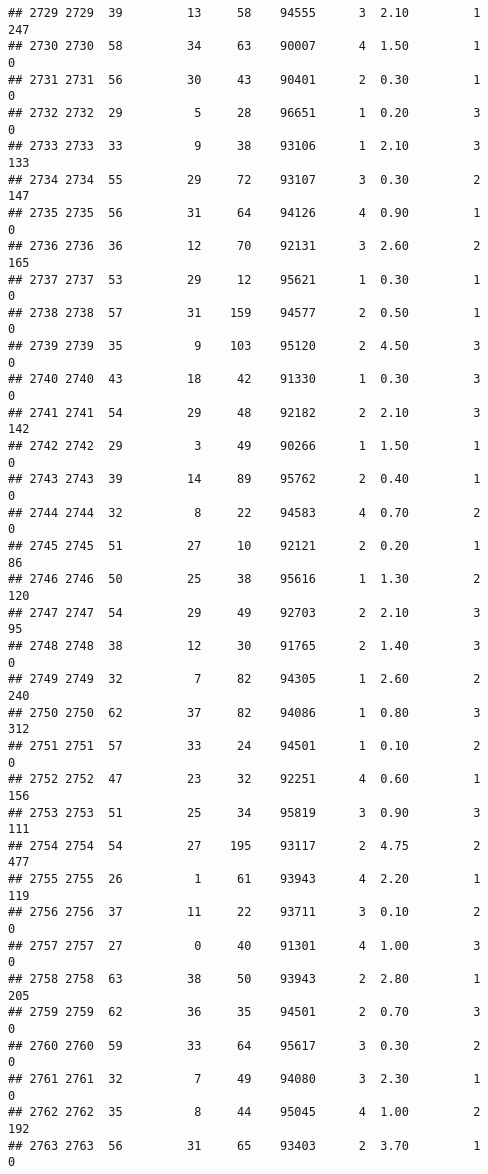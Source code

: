 \documentclass[
]{article}
\begin{document}
\begin{verbatim}
## 2729 2729  39         13     58    94555      3  2.10         1      247
## 2730 2730  58         34     63    90007      4  1.50         1        0
## 2731 2731  56         30     43    90401      2  0.30         1        0
## 2732 2732  29          5     28    96651      1  0.20         3        0
## 2733 2733  33          9     38    93106      1  2.10         3      133
## 2734 2734  55         29     72    93107      3  0.30         2      147
## 2735 2735  56         31     64    94126      4  0.90         1        0
## 2736 2736  36         12     70    92131      3  2.60         2      165
## 2737 2737  53         29     12    95621      1  0.30         1        0
## 2738 2738  57         31    159    94577      2  0.50         1        0
## 2739 2739  35          9    103    95120      2  4.50         3        0
## 2740 2740  43         18     42    91330      1  0.30         3        0
## 2741 2741  54         29     48    92182      2  2.10         3      142
## 2742 2742  29          3     49    90266      1  1.50         1        0
## 2743 2743  39         14     89    95762      2  0.40         1        0
## 2744 2744  32          8     22    94583      4  0.70         2        0
## 2745 2745  51         27     10    92121      2  0.20         1       86
## 2746 2746  50         25     38    95616      1  1.30         2      120
## 2747 2747  54         29     49    92703      2  2.10         3       95
## 2748 2748  38         12     30    91765      2  1.40         3        0
## 2749 2749  32          7     82    94305      1  2.60         2      240
## 2750 2750  62         37     82    94086      1  0.80         3      312
## 2751 2751  57         33     24    94501      1  0.10         2        0
## 2752 2752  47         23     32    92251      4  0.60         1      156
## 2753 2753  51         25     34    95819      3  0.90         3      111
## 2754 2754  54         27    195    93117      2  4.75         2      477
## 2755 2755  26          1     61    93943      4  2.20         1      119
## 2756 2756  37         11     22    93711      3  0.10         2        0
## 2757 2757  27          0     40    91301      4  1.00         3        0
## 2758 2758  63         38     50    93943      2  2.80         1      205
## 2759 2759  62         36     35    94501      2  0.70         3        0
## 2760 2760  59         33     64    95617      3  0.30         2        0
## 2761 2761  32          7     49    94080      3  2.30         1        0
## 2762 2762  35          8     44    95045      4  1.00         2      192
## 2763 2763  56         31     65    93403      2  3.70         1        0

\end{verbatim}
\end{document}
